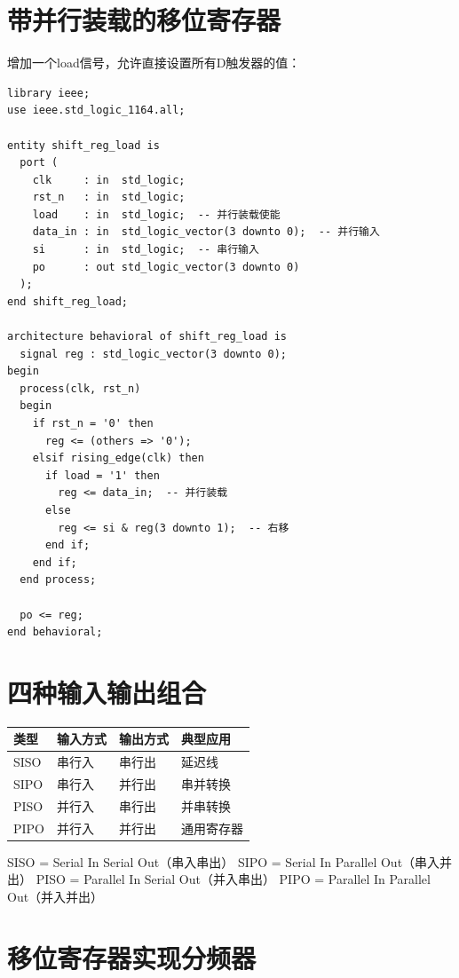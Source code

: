 \section{带并行装载的移位寄存器}

增加一个load信号，允许直接设置所有D触发器的值：

\begin{lstlisting}[caption={带并行装载的移位寄存器}]
library ieee;
use ieee.std_logic_1164.all;

entity shift_reg_load is
  port (
    clk     : in  std_logic;
    rst_n   : in  std_logic;
    load    : in  std_logic;  -- 并行装载使能
    data_in : in  std_logic_vector(3 downto 0);  -- 并行输入
    si      : in  std_logic;  -- 串行输入
    po      : out std_logic_vector(3 downto 0)
  );
end shift_reg_load;

architecture behavioral of shift_reg_load is
  signal reg : std_logic_vector(3 downto 0);
begin
  process(clk, rst_n)
  begin
    if rst_n = '0' then
      reg <= (others => '0');
    elsif rising_edge(clk) then
      if load = '1' then
        reg <= data_in;  -- 并行装载
      else
        reg <= si & reg(3 downto 1);  -- 右移
      end if;
    end if;
  end process;

  po <= reg;
end behavioral;
\end{lstlisting}

\section{四种输入输出组合}

\begin{center}
\begin{tabular}{|l|l|l|l|}
\hline
\textbf{类型} & \textbf{输入方式} & \textbf{输出方式} & \textbf{典型应用} \\
\hline
SISO & 串行入 & 串行出 & 延迟线 \\
SIPO & 串行入 & 并行出 & 串并转换 \\
PISO & 并行入 & 串行出 & 并串转换 \\
PIPO & 并行入 & 并行出 & 通用寄存器 \\
\hline
\end{tabular}
\end{center}

SISO = Serial In Serial Out（串入串出）
SIPO = Serial In Parallel Out（串入并出）
PISO = Parallel In Serial Out（并入串出）
PIPO = Parallel In Parallel Out（并入并出）

\section{移位寄存器实现分频器}

